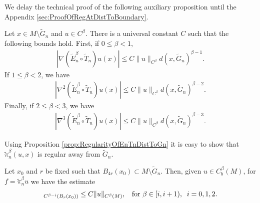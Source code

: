 \documentclass[11pt,reqno]{amsart}
\numberwithin{equation}{section}
\theoremstyle{plain}
\begin{document}
We delay the technical proof of the following auxiliary proposition until the Appendix \ref{sec:ProofOfRegAtDistToBoundary}.

\begin{prop}\label{prop:RegularityOfEnTnDistToGn}
  Let $x  \in M\setminus \tilde G_n$ and $u\in C^\beta$. There is a universal constant $C$ such that the following bounds hold. First, if $0\leq\beta<1$, 
  \begin{align*}	
    |\nabla (\tilde E_n^\beta\circ \tilde T_n)u(x)|\leq C\|u\|_{C^\beta}d(x,\tilde G_n)^{\beta-1}.
  \end{align*}	
  If $1\leq\beta<2$, we have
  \begin{align*}	
    |\nabla^2(\tilde E_n^\beta\circ \tilde T_n)u(x)|\leq C\|u\|_{C^\beta}d(x,\tilde G_n)^{\beta-2}.
  \end{align*}	
  Finally, if $2\leq\beta<3$, we have
  \begin{align*}	
    |\nabla^3(\tilde E_n^\beta\circ \tilde T_n)u(x)|\leq C\|u\|_{C^\beta}d(x,\tilde G_n)^{\beta-3}.
  \end{align*}	
 
\end{prop}

Using Proposition \ref{prop:RegularityOfEnTnDistToGn} it is easy to show that $\tilde \pi_n^\beta(u,x)$ is regular away from $\tilde G_n$.
\begin{prop}\label{prop:InteriorEstimate}
  Let $x_0$ and $r$ be fixed such that $B_{4r}(x_0) \subset M \setminus  \tilde G_n$. Then, given $u\in C^\beta_b(M)$, for $f=\tilde \pi_n^\beta u$ we have the estimate
  \begin{align*}
    [\nabla^i f]_{C^{\beta-i} (B_r(x_0))} \leq C\|u\|_{C^\beta(M)},\;\;\textnormal{ for } \beta \in [i,i+1),\;\;i=0,1,2.
  \end{align*}	    
\end{prop}
\end{document}
